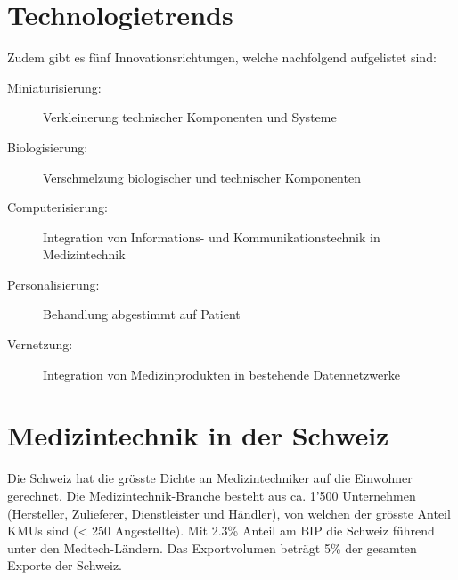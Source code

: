 \section{Technologietrends}

Zudem gibt es fünf Innovationsrichtungen, welche nachfolgend aufgelistet sind:

\begin{description}
	\item[Miniaturisierung:] Verkleinerung technischer Komponenten und Systeme
	\item[Biologisierung:] Verschmelzung biologischer und technischer Komponenten
	\item[Computerisierung:] Integration von Informations- und Kommunikationstechnik in Medizintechnik
	\item[Personalisierung:] Behandlung abgestimmt auf Patient
	\item[Vernetzung:] Integration von Medizinprodukten in bestehende Datennetzwerke
\end{description}

\section{Medizintechnik in der Schweiz}

Die Schweiz hat die grösste Dichte an Medizintechniker auf die Einwohner gerechnet. Die Medizintechnik-Branche besteht aus ca. 1'500 Unternehmen (Hersteller, Zulieferer, Dienstleister und Händler), von welchen der grösste Anteil KMUs sind (< 250 Angestellte). Mit 2.3\% Anteil am BIP die Schweiz führend unter den Medtech-Ländern. Das Exportvolumen beträgt 5\% der gesamten Exporte der Schweiz. 